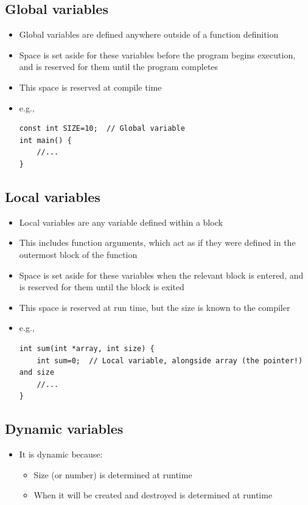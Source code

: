 \subsection{Global variables}
\begin{itemize}
	\item Global variables are defined anywhere outside of a function definition
	\item Space is set aside for these variables before the program begins execution, and is reserved for them until the program completes
	\item This space is reserved at compile time
	\item e.g.,
\begin{lstlisting}[style=C++]
const int SIZE=10;	// Global variable
int main() {
	//...
}
\end{lstlisting}
\end{itemize}

\subsection{Local variables}
\begin{itemize}
	\item Local variables are any variable defined within a block
	\item This includes function arguments, which act as if they were defined in the outermost block of the function
	\item Space is set aside for these variables when the relevant block is entered, and is reserved for them until the block is exited
	\item This space is reserved at run time, but the size is known to the compiler
	\item e.g.,
\begin{lstlisting}[style=C++]
int sum(int *array, int size) {
	int sum=0; 	// Local variable, alongside array (the pointer!) and size
	//...
}
\end{lstlisting}
\end{itemize}

\subsection{Dynamic variables}
\begin{itemize}
	\item It is dynamic because:
	\begin{itemize}
		\item Size (or number) is determined at runtime
		\item When it will be created and destroyed is determined at runtime
	\end{itemize}
\end{itemize}

